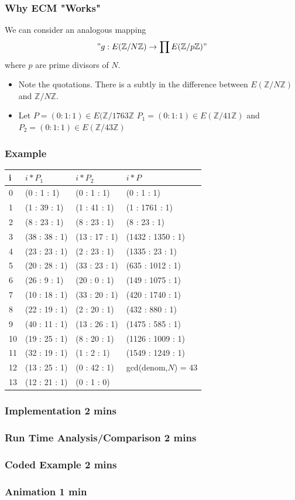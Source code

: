 \documentclass{beamer}
\begin{document}
\begin{frame}
\frametitle{Why ECM "Works"}
We can consider an analogous mapping 
$$
	"g: E(\mathbb{Z}/N\mathbb{Z}) \rightarrow \prod E(\mathbb{Z}/p\mathbb{Z})"
$$
where $p$ are prime divisors of $N$. 

\begin{itemize}
\item Note the quotations. There is a subtly in the difference between $E(\mathbb{Z}/N\mathbb{Z})$ and $\mathbb{Z}/N\mathbb{Z}$. 
\item  Let $P = (0:1:1) \in E(\mathbb{Z}/1763\mathbb{Z}$ $P_1 = (0:1:1) \in E(\mathbb{Z}/41\mathbb{Z})$ and $P_2 = (0:1:1) \in E(\mathbb{Z}/43\mathbb{Z})$
\end{itemize}
\end{frame}

\begin{frame}
\frametitle{Example}
\begin{tabular}{l|l|l|l}
i & $i*P_1$ & $i*P_2$ & $i*P$ \\
\hline
0 & (0 : 1 : 1) & (0 : 1 : 1) & (0 : 1 : 1)\\
1 & (1 : 39 : 1)& (1 : 41 : 1) & (1 : 1761 : 1) \\
2 & (8 : 23 : 1)& (8 : 23 : 1) & (8 : 23 : 1) \\
3 &(38 : 38 : 1)& (13 : 17 : 1) & (1432 : 1350 : 1) \\
4 &(23 : 23 : 1) & (2 : 23 : 1) & (1335 : 23 : 1) \\
5 &(20 : 28 : 1) & (33 : 23 : 1) & (635 : 1012 : 1) \\
6 &(26 : 9 : 1) & (20 : 0 : 1) & (149 : 1075 : 1) \\
7& (10 : 18 : 1) &(33 : 20 : 1) & (420 : 1740 : 1) \\
8& (22 : 19 : 1) &(2 : 20 : 1) & (432 : 880 : 1)\\
9 &(40 : 11 : 1) &(13 : 26 : 1) & (1475 : 585 : 1)\\
10 &(19 : 25 : 1) &(8 : 20 : 1) & (1126 : 1009 : 1)\\
11& (32 : 19 : 1)& (1 : 2 : 1) & (1549 : 1249 : 1) \\
12& (13 : 25 : 1)& (0 : 42 : 1) & gcd(denom,$N$) = 43 \\
13 &(12 : 21 : 1) &(0 : 1 : 0) &
\end{tabular}
\end{frame}

\begin{frame}
\frametitle{Implementation 2 mins}

\end{frame}

\begin{frame}
\frametitle{Run Time Analysis/Comparison 2 mins}

\end{frame}

\begin{frame}
\frametitle{Coded Example 2 mins}

\end{frame}

\begin{frame}
\frametitle{Animation 1 min}

\end{frame}
\end{document}
